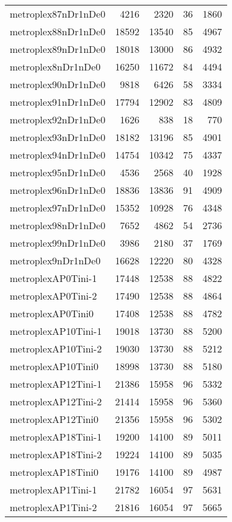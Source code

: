 \begin{longtable}{lrrrr}
metroplex87nDr1nDe0 & 4216 & 2320 & 36 & 1860 \\
metroplex88nDr1nDe0 & 18592 & 13540 & 85 & 4967 \\
metroplex89nDr1nDe0 & 18018 & 13000 & 86 & 4932 \\
metroplex8nDr1nDe0 & 16250 & 11672 & 84 & 4494 \\
metroplex90nDr1nDe0 & 9818 & 6426 & 58 & 3334 \\
metroplex91nDr1nDe0 & 17794 & 12902 & 83 & 4809 \\
metroplex92nDr1nDe0 & 1626 & 838 & 18 & 770 \\
metroplex93nDr1nDe0 & 18182 & 13196 & 85 & 4901 \\
metroplex94nDr1nDe0 & 14754 & 10342 & 75 & 4337 \\
metroplex95nDr1nDe0 & 4536 & 2568 & 40 & 1928 \\
metroplex96nDr1nDe0 & 18836 & 13836 & 91 & 4909 \\
metroplex97nDr1nDe0 & 15352 & 10928 & 76 & 4348 \\
metroplex98nDr1nDe0 & 7652 & 4862 & 54 & 2736 \\
metroplex99nDr1nDe0 & 3986 & 2180 & 37 & 1769 \\
metroplex9nDr1nDe0 & 16628 & 12220 & 80 & 4328 \\
metroplexAP0Tini-1 & 17448 & 12538 & 88 & 4822 \\
metroplexAP0Tini-2 & 17490 & 12538 & 88 & 4864 \\
metroplexAP0Tini0 & 17408 & 12538 & 88 & 4782 \\
metroplexAP10Tini-1 & 19018 & 13730 & 88 & 5200 \\
metroplexAP10Tini-2 & 19030 & 13730 & 88 & 5212 \\
metroplexAP10Tini0 & 18998 & 13730 & 88 & 5180 \\
metroplexAP12Tini-1 & 21386 & 15958 & 96 & 5332 \\
metroplexAP12Tini-2 & 21414 & 15958 & 96 & 5360 \\
metroplexAP12Tini0 & 21356 & 15958 & 96 & 5302 \\
metroplexAP18Tini-1 & 19200 & 14100 & 89 & 5011 \\
metroplexAP18Tini-2 & 19224 & 14100 & 89 & 5035 \\
metroplexAP18Tini0 & 19176 & 14100 & 89 & 4987 \\
metroplexAP1Tini-1 & 21782 & 16054 & 97 & 5631 \\
metroplexAP1Tini-2 & 21816 & 16054 & 97 & 5665 \\

\end{longtable}
